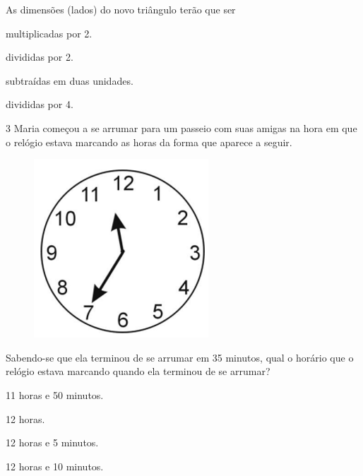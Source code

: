 As dimensões (lados) do novo triângulo terão que ser

\begin{escolha}
\item
  multiplicadas por 2.
\item
  divididas por 2.
\item
  subtraídas em duas unidades.
\item
  divididas por 4.
\end{escolha}


\num{3} Maria começou a se arrumar para um passeio com suas amigas na hora
em que o relógio estava marcando as horas da forma que aparece a seguir.

\begin{figure}[htpb!]
\includegraphics[width=.5\textwidth]{./imgs/mat9.png}
\end{figure}

Sabendo-se que ela terminou de se arrumar em 35 minutos, qual o horário
que o relógio estava marcando quando ela terminou de se arrumar?

\begin{escolha}
\item
  11 horas e 50 minutos.
\item
  12 horas.
\item
  12 horas e 5 minutos.
\item
  12 horas e 10 minutos.
\end{escolha}

